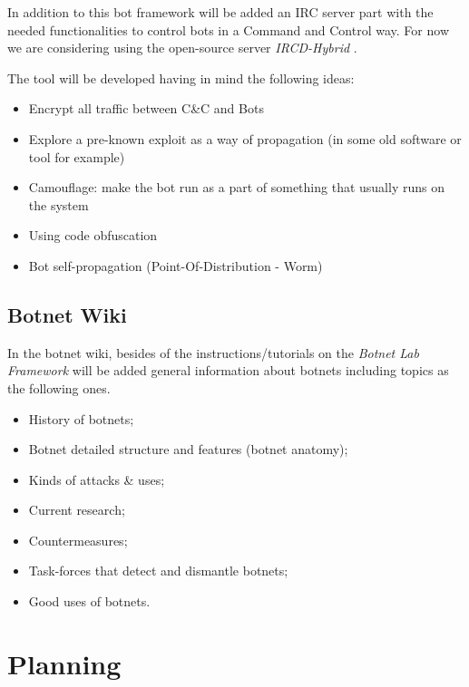 \documentclass[]{article}
\begin{document}
In addition to this bot framework will be added an IRC server part with the needed functionalities to control bots in a Command and Control way. For now we are considering using the open-source server \textit{IRCD-Hybrid} \cite{app:ircdhybrid}.

The tool will be developed having in mind the following ideas:
\begin{itemize}
	\item Encrypt all traffic between C\&C and Bots
	\item Explore a pre-known exploit as a way of propagation (in some old software or tool for example)
	\item Camouflage: make the bot run as a part of something that usually runs on the system
	\item Using code obfuscation
	\item Bot self-propagation (Point-Of-Distribution - Worm)
\end{itemize}


\subsection{Botnet Wiki}

In the botnet wiki, besides of the instructions/tutorials on the \textit{Botnet Lab Framework} will be added general information about botnets including topics as the following ones.
\begin{itemize}
	\item History of botnets;
	\item Botnet detailed structure and features (botnet anatomy);
	\item Kinds of attacks \& uses;
	\item Current research;
	\item Countermeasures;
	\item Task-forces that detect and dismantle botnets;
	\item Good uses of botnets.
\end{itemize}

\section{Planning}


 
\end{document}
